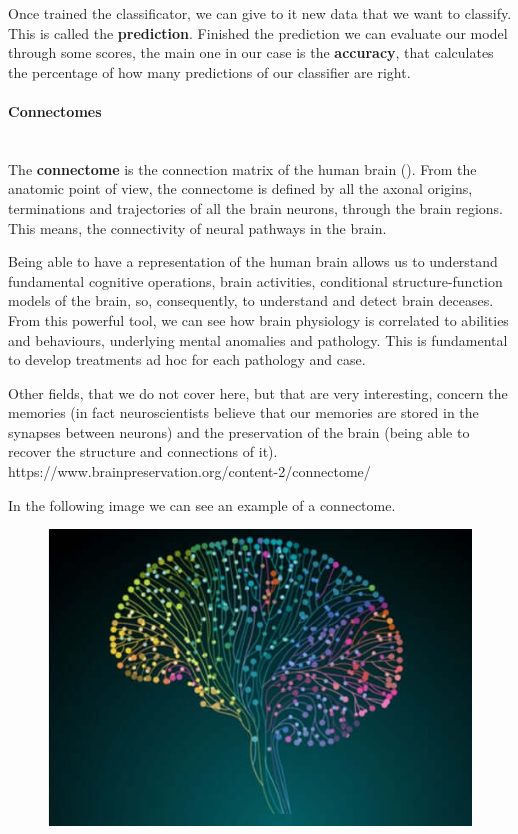 Once trained the classificator, we can give to it new data that we want to classify. This is called the \textbf{prediction}. Finished the prediction we can evaluate our model through some scores, the main one in our case is the \textbf{accuracy}, that calculates the percentage of how many predictions of our classifier are right. 

\paragraph{Connectomes}\
\\
The \textbf{connectome} is the connection matrix of the human brain (\cite{connectome}). From the anatomic point of view, the connectome is defined by all the axonal origins, terminations and trajectories of all the brain neurons, through the brain regions. This means, the connectivity of neural pathways in the brain. 

Being able to have a representation of the human brain allows us to understand fundamental cognitive operations, brain activities, conditional structure-function models of the brain, so, consequently, to understand and detect brain deceases. From this powerful tool, we can see how brain physiology is correlated to abilities and behaviours, underlying mental anomalies and pathology. This is fundamental to develop treatments ad hoc for each pathology and case. 

Other fields, that we do not cover here, but that are very interesting, concern the memories (in fact neuroscientists believe that our memories are stored in the synapses between neurons) and the preservation of the brain (being able to recover the structure and connections of it).
https://www.brainpreservation.org/content-2/connectome/

In the following image we can see an example of a connectome.

\begin{figure}[htbp]
	\centering
	\includegraphics[scale=0.3]{Immagini/cervello-connessioni-neuroni-colorate.jpg}
	\caption{\label{fig:diagram3}}
\end{figure}



